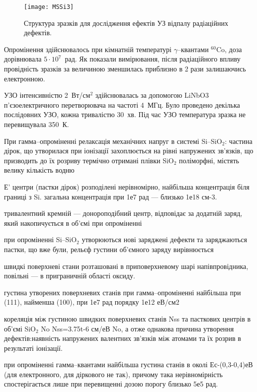 \documentclass[a4paper,14pt,oneside,openany]{memoir}
\begin{document}
\begin{figure}[b]
\center
\texttt{[image: MSSi3]}%
\caption{\label{figMSSi3}
Структура зразків для дослідження ефектів УЗ відпалу радіаційних дефектів.
}
\end{figure}

Опромінення здійснювалось при кімнатній температурі $\gamma$--квантами $^{60}$Co, доза дорівнювала $5\cdot10^7$~рад.
Як показали вимірювання, після радіаційного впливу провідність зразків за величиною зменшилась приблизно в 2 рази залишаючись електронною.

УЗО інтенсивністю 2~Вт/см$^2$ здійснювалась за допомогою LiNbO$3$ п'єзоелектричного перетворювача на частоті 4~МГц.
Було проведено декілька послідовних УЗО, кожна тривалістю 30~хв.
Під час УЗО температура зразка не перевищувала 350~К.


\cite{PersenkovBook}
При гамма--опроміненні релаксація механічних напруг в системі Si--SiO$_2$:
частина дірок, що утворилася при іонізації захоплюється на рівні напружених зв'язків, що призводить до їх розриву
термічно отримані плівки SiO$_2$ поліморфні,
містять велику кількість водню

Е' центри (пастки дірок) розподілені нерівномірно, найбільша концентрація біля границі з Si.
загальна концентрація при 1е7 рад ---  близько 1е18 см-3.

тривалентний кремній --- донороподібний центр,
відповідає за додатній заряд, який накопичується в об'ємі при опроміненні

при опроміненні Si--SiO$_2$ утворюються нові заряджені дефекти та заряджаються пастки,
що вже були,
рельєф густини об'ємного заряду вирівнюється

швидкі поверхневі стани розташовані в приповерхневому шарі напівпровідника,
повільні --- в приграничній області оксиду.

густина утворених поверхневих станів при гамма--опроміненні найбільша при (111), найменша (100),
при 1е7 рад порядку 1е12 еВ/см2

кореляція між густиною швидких поверхневих станів Nss та пасткових центрів в об'ємі SiO$_2$ No
Nss=3.75t-6 см/еВ No,
а отже однакова причина утворення дефектів:наявність напружених валентних зв'язків між атомами та їх розрив в результаті іонізації.

при опроміненні гамма--квантами найбільша густина станів в околі Ес-(0,3-0,4)еВ (для електронного, для діркового не так),
причому така нерівномірність спостерігається лише при перевищенні дозою порогу близько 5е5 рад.
\end{document}
